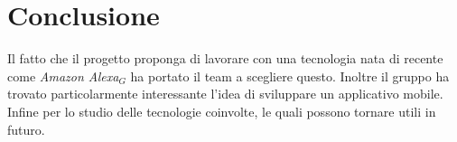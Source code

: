 \section{Conclusione}
Il fatto che il progetto proponga di lavorare con una tecnologia nata di recente come \emph{Amazon Alexa$_{G}$} ha portato il team a scegliere questo. Inoltre il gruppo ha trovato particolarmente interessante l'idea di sviluppare un applicativo mobile. Infine per lo studio delle tecnologie coinvolte, le quali possono tornare utili in futuro.
